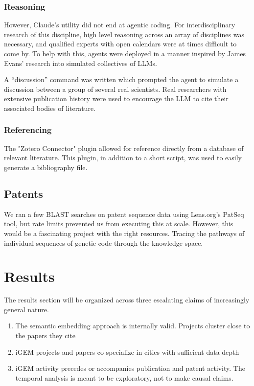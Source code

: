 \documentclass[12pt,a4paper]{article}
\begin{document}
	\subsubsection{Reasoning}
	
	However, Claude's utility did not end at agentic coding. For interdisciplinary research of this discipline, high level reasoning across an array of disciplines was necessary, and qualified experts with open calendars were at times difficult to come by. To help with this, agents were deployed in a manner inspired by James Evans' research into simulated collectives of LLMs.
	
	A ``discussion'' command was written which prompted the agent to simulate a discussion between a group of several real scientists. Real researchers with extensive publication history were used to encourage the LLM to cite their associated bodies of literature.
	
	\subsubsection{Referencing}
	
	The "Zotero Connector" plugin allowed for reference directly from a database of relevant literature. This plugin, in addition to a short script, was used to easily generate a bibliography file.
	
	
	
	\subsection{Patents}
	
	We ran a few BLAST searches on patent sequence data using Lens.org's PatSeq tool, but rate limits prevented us from executing this at scale. However, this would be a fascinating project with the right resources. Tracing the pathways of individual sequences of genetic code through the knowledge space.
	
	
	\section{Results}
	
	
	The results section will be organized across three escalating claims of increasingly general nature.
	\begin{enumerate}
		\item The semantic embedding approach is internally valid. Projects cluster close to the papers they cite
		\item iGEM projects and papers co-specialize in cities with sufficient data depth
		\item iGEM activity precedes or accompanies publication and patent activity. The temporal analysis is meant to be exploratory, not to make causal claims.
	\end{enumerate}
	
\end{document}

